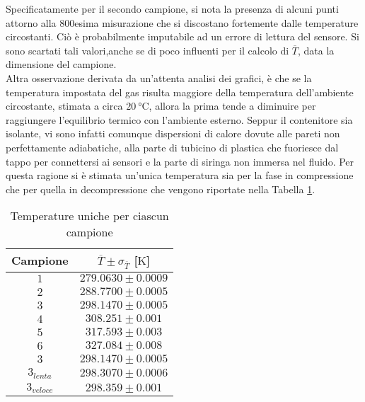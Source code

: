 \documentclass[a4paper,11pt,oneside]{article}
\begin{document}
Specificatamente per il secondo campione, si nota la presenza di alcuni punti attorno alla 800esima misurazione che si discostano fortemente dalle temperature circostanti. Ciò è probabilmente imputabile ad un errore di lettura del sensore. Si sono scartati tali valori,anche se di poco influenti per il calcolo di $\overline{T}$, data la dimensione del campione.\\

Altra osservazione derivata da un'attenta analisi dei grafici, è che se la temperatura impostata del gas risulta maggiore della temperatura dell'ambiente circostante, stimata a circa $\SI{20}{\celsius}$, allora la prima tende a diminuire per raggiungere l'equilibrio termico con l'ambiente esterno. Seppur il contenitore sia isolante, vi sono infatti comunque dispersioni di calore dovute alle pareti non perfettamente adiabatiche, alla parte di tubicino di plastica che fuoriesce dal tappo per connettersi ai sensori e la parte di siringa non immersa nel fluido. Per questa ragione si è stimata un'unica temperatura sia per la fase in compressione che per quella in decompressione che vengono riportate nella Tabella \ref{tab:temp_unica}.

\begin{table}[h!]
    \centering
    \begin{tabular}{|c|c|}
        \hline
        Campione & $\overline{T}\pm\sigma_{\overline{T}}$ [$\si{\kelvin}$] \\ \hline
        \rowcolor[rgb]{0.85,0.85,0.85}$1$ & $279.0630\pm0.0009$ \\ \hline
        $2$ & $288.7700\pm0.0005$ \\ \hline
        \rowcolor[rgb]{0.85,0.85,0.85}$3$ & $298.1470\pm0.0005$ \\ \hline
        $4$ & $308.251\pm0.001$ \\ \hline
        \rowcolor[rgb]{0.85,0.85,0.85}$5$ & $317.593\pm0.003$ \\ \hline
        $6$ & $327.084\pm0.008$ \\ \hline \hline
        \rowcolor[rgb]{0.85,0.85,0.85}$3$ & $298.1470\pm0.0005$ \\ \hline
        $3_{lenta}$ & $298.3070\pm0.0006$ \\ \hline
        \rowcolor[rgb]{0.85,0.85,0.85}$3_{veloce}$ & $298.359\pm0.001$ \\ \hline
    \end{tabular}
    \caption{Temperature uniche per ciascun campione}
    \label{tab:temp_unica}
\end{table}
\end{document}
